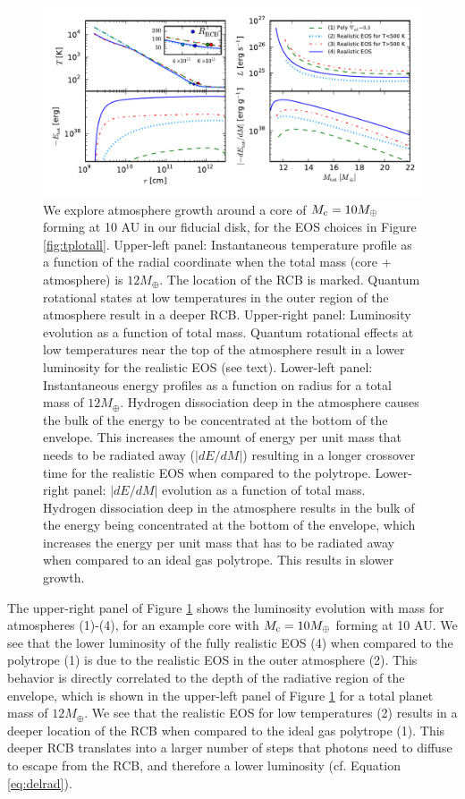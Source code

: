 \documentclass[apj]{emulateapj}
\newcommand{\co}{_{\rm c}}
\begin{document}
\begin{figure}[tb]
\centering
\includegraphics[width=\textwidth]{../../figs/ModelAtmospheres/RadSelfGravRealEOS/PaperFigs/all_plot.pdf}
\caption{We explore atmosphere growth around a core of $M\co=10 M_{\oplus}$ forming at 10 AU in our fiducial disk, for the EOS choices in Figure \ref{fig:tplotall}. Upper-left panel:  Instantaneous temperature profile as a function of the radial coordinate when the total mass (core + atmosphere) is $12 M_{\oplus}$. The location of the RCB is marked. Quantum rotational states at low temperatures in the outer region of the atmosphere result in a deeper RCB. Upper-right panel:  Luminosity evolution as a function of total mass. Quantum rotational effects at low temperatures near the top of the atmosphere result in a lower luminosity for the realistic EOS (see text). Lower-left panel: Instantaneous energy profiles as a function on radius for a total mass of $12 M_{\oplus}$. Hydrogen dissociation deep in the atmosphere causes the bulk of the energy to be concentrated at the bottom of the envelope. This increases the amount of energy per unit mass that needs to be radiated away ($|dE/dM|$) resulting in a longer crossover time for the realistic EOS when compared to the polytrope. Lower-right panel:  $|dE/dM|$ evolution as a function of total mass. Hydrogen dissociation deep in the atmosphere results in the bulk of the energy being concentrated at the bottom of the envelope, which increases the energy per unit mass that has to be radiated away when compared to an ideal gas polytrope. This results in slower growth.}
\label{fig:all_plot}
\end{figure}

The upper-right panel of Figure \ref{fig:all_plot} shows the luminosity evolution with mass for atmospheres (1)-(4), for an example core with $M\co=10 M_{\oplus}$ forming at 10 AU. We see that the lower luminosity of the fully realistic EOS (4) when compared to the polytrope (1) is due to the realistic EOS in the outer atmosphere (2). This behavior is directly correlated to the depth of the radiative region of the envelope, which is shown in the upper-left panel of Figure \ref{fig:all_plot} for a total planet mass of $12 M_{\oplus}$. We see that the realistic EOS for low temperatures (2) results in a deeper location of the RCB when compared to the ideal gas polytrope (1). This deeper RCB translates into a larger number of steps that photons need to diffuse to escape from the RCB, and therefore a lower luminosity (cf. Equation \ref{eq:delrad}). 
\end{document}
